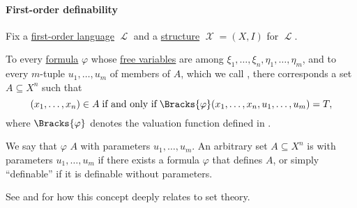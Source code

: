 \paragraph{First-order definability}

\begin{definition}\label{def:first_order_definability}
  Fix a \hyperref[def:first_order_language]{first-order language} \( \mscrL \) and a \hyperref[def:first_order_structure]{structure} \( \mscrX = (X, I) \) for \( \mscrL \).

  To every \hyperref[def:first_order_syntax/formula]{formula} \( \varphi \) whose \hyperref[def:first_order_syntax/formula_free_variables]{free variables} are among \( \xi_1, \ldots, \xi_n, \eta_1, \ldots, \eta_m \), and to every \( m \)-tuple \( u_1, \ldots, u_m \) of members of \( A \), which we call , there corresponds a set \( A \subseteq X^n \) such that
  \begin{equation*}
    (x_1, \ldots, x_n) \in A \T{if and only if} \Bracks{\varphi}(x_1, \ldots, x_n, u_1, \ldots, u_m) = T,
  \end{equation*}
  where \( \Bracks{\varphi} \) denotes the valuation function defined in .

  We say that \( \varphi \)  \( A \) with parameters \( u_1, \ldots, u_m \). An arbitrary set \( A \subseteq X^n \) is  with parameters \( u_1, \ldots, u_m \) if there exists a formula \( \varphi \) that defines \( A \), or simply \enquote{definable} if it is definable without parameters.
\end{definition}
\begin{comments}
  \item See  and  for how this concept deeply relates to set theory.
\end{comments}

